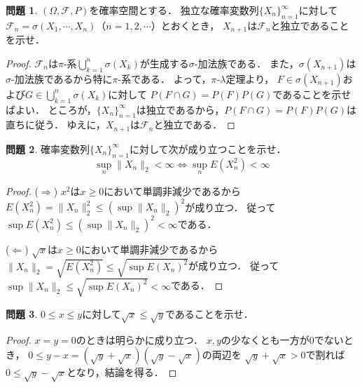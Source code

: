 \documentclass{jsarticle}
\theoremstyle{definition}
\newtheorem{qst}{問題}
\begin{document}
\begin{qst}
$(\Omega,\mathcal{F},P)$を確率空間とする．
独立な確率変数列$\{X_n\}_{n=1}^\infty$に対して
$\mathcal{F}_n=\sigma(X_1,\cdots,X_n)$（$n=1,2,\cdots$）とおくとき，
$X_{n+1}$は$\mathcal{F}_n$と独立であることを示せ．
\end{qst}
\begin{proof}
$\mathcal{F}_n$は$\pi$-系$\bigcup_{k=1}^n\sigma(X_k)$が生成する$\sigma$-加法族である．
また，$\sigma(X_{n+1})$は$\sigma$-加法族であるから特に$\pi$-系である．
よって，$\pi$-$\lambda$定理より，
$F\in\sigma(X_{n+1})$および$G\in\bigcup_{k=1}^n\sigma(X_k)$に対して
$P(F\cap G)=P(F)P(G)$であることを示せばよい．
ところが，$\{X_n\}_{n=1}^\infty$は独立であるから，$P(F\cap G)=P(F)P(G)$は直ちに従う．
ゆえに，$X_{n+1}$は$\mathcal{F}_n$と独立である．
\end{proof}

\begin{qst}
確率変数列$\{X_n\}_{n=1}^\infty$に対して次が成り立つことを示せ．
\[ \sup_n\|X_n\|_2<\infty\Leftrightarrow\sup_nE(X_n^2)<\infty \]
\end{qst}
\begin{proof}
($\Rightarrow$)
$x^2$は$x\geq0$において単調非減少であるから
$E(X_n^2)=\|X_n\|_2^2\leq(\sup\|X_n\|_2)^2$が成り立つ．
従って$\sup E(X_n^2)\leq(\sup\|X_n\|_2)^2<\infty$である．

($\Leftarrow$)
$\sqrt{x}$は$x\geq0$において単調非減少であるから
$\|X_n\|_2=\sqrt{E(X_n^2)}\leq\sqrt{\sup E(X_n)^2}$が成り立つ．
従って$\sup\|X_n\|_2\leq\sqrt{\sup E(X_n)^2}<\infty$である．
\end{proof}

\begin{qst}
$0\leq x\leq y$に対して$\sqrt{x}\leq\sqrt{y}$であることを示せ．
\end{qst}
\begin{proof}
$x=y=0$のときは明らかに成り立つ．
$x,y$の少なくとも一方が0でないとき，
$0\leq y-x=(\sqrt{y}+\sqrt{x})(\sqrt{y}-\sqrt{x})$の両辺を
$\sqrt{y}+\sqrt{x}>0$で割れば$0\leq\sqrt{y}-\sqrt{x}$となり，結論を得る．
\end{proof}
\end{document}
